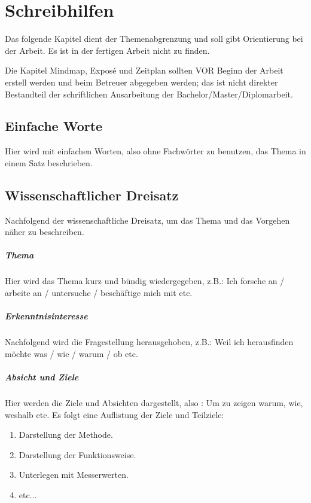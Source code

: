 \chapter{Schreibhilfen}
\label{chap:writing}
Das folgende Kapitel dient der Themenabgrenzung und soll gibt Orientierung bei der Arbeit. Es ist in der fertigen Arbeit nicht zu finden.

Die Kapitel Mindmap, Exposé und Zeitplan sollten VOR Beginn der Arbeit erstell werden und beim Betreuer abgegeben werden; das ist nicht direkter Bestandteil der schriftlichen Ausarbeitung der Bachelor/Master/Diplomarbeit.

\section{Einfache Worte}
Hier wird mit einfachen Worten, also ohne Fachwörter zu benutzen, das Thema in einem Satz beschrieben.

\section{Wissenschaftlicher Dreisatz}
Nachfolgend der wissenschaftliche Dreisatz, um das Thema und das Vorgehen näher zu beschreiben.

\paragraph{Thema}
Hier wird das Thema kurz und bündig wiedergegeben, z.B.: Ich forsche an / arbeite an / untersuche / beschäftige mich mit etc.

\paragraph{Erkenntnisinteresse}
Nachfolgend wird die Fragestellung herausgehoben, z.B.: Weil ich herausfinden möchte was / wie / warum / ob etc.

\paragraph{Absicht und Ziele}
Hier werden die Ziele und Absichten dargestellt, also : Um zu zeigen warum, wie, weshalb etc. Es folgt eine Auflistung der Ziele und Teilziele:

\begin{enumerate}
\item Darstellung der Methode.
\item Darstellung der Funktionsweise.
\item Unterlegen mit Messerwerten.
\item etc...
\end{enumerate}

